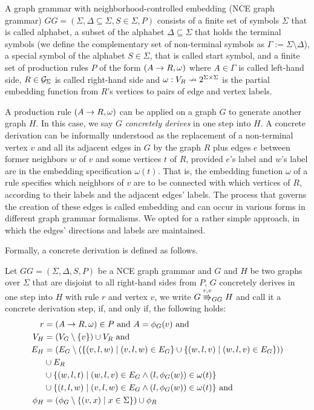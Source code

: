 \documentclass[runningheads]{llncs}
\begin{document}
\begin{definition}
	\label{def:gg}
	A graph grammar with neighborhood-controlled embedding (NCE graph grammar) $\mathit{GG} = (\Sigma, \Delta \subseteq \Sigma, S \in \Sigma, P)$ consists of a finite set of symbols $\Sigma$ that is called alphabet, a subset of the alphabet $\Delta \subseteq \Sigma$ that holds the terminal symbols (we define the complementary set of non-terminal symbols as $\Gamma := \Sigma \setminus \Delta$), a special symbol of the alphabet $S \in \Sigma$, that is called start symbol, and a finite set of production rules $P$ of the form $(A \to R, \omega)$ where $A \in \Gamma$ is called left-hand side, $R \in \mathcal{G}_{\Sigma}$ is called right-hand side and $\omega : V_R \nrightarrow 2^{\Sigma \times \Sigma}$ is the partial embedding function from $R$'s vertices to pairs of edge and vertex labels.
\end{definition}

A production rule $(A \to R, \omega)$ can be applied on a graph $G$ to generate another graph $H$. In this case, we say $G$ \textit{concretely derives} in one step into $H$. A concrete derivation can be informally understood as the replacement of a non-terminal vertex $v$ and all its adjacent edges in $G$ by the graph $R$ plus edges $e$ between former neighbors $w$ of $v$ and some vertices $t$ of $R$, provided $e$'s label and $w$'s label are in the embedding specification $\omega(t)$. That is, the embedding function $\omega$ of a rule specifies which neighbors of $v$ are to be connected with which vertices of $R$, according to their labels and the adjacent edges' labels. The process that governs the creation of these edges is called embedding and can occur in various forms in different graph grammar formalisms. We opted for a rather simple approach, in which the edges' directions and labels are maintained.

Formally, a concrete derivation is defined as follows.

\begin{definition}
	\label{def:gg_dstep}
	Let $\mathit{GG} = (\Sigma, \Delta, S, P)$ be a NCE graph grammar and $G$ and $H$ be two graphs over $\Sigma$ that are disjoint to all right-hand sides from $P$, $G$ concretely derives in one step into $H$ with rule $r$ and vertex $v$, we write $G \cderiv{r}{v}{GG} H$ and call it a concrete derivation step, if, and only if, the following holds:
	\begin{align*}
	r & = (A \to R, \omega) \in P \text{ and } A = \phi_G(v) \text{ and} \\
	V_H  & = (V_G \setminus \{v\}) \cup V_R \text{ and} \\
	E_H & = (E_G \setminus (\{(v,l,w) \; | \; (v,l,w) \in E_G\} \cup \{(w,l,v) \; | \; (w,l,v) \in E_G\})) \\
	& \cup E_R \\
	& \cup \{(w,l,t) \; | \; (w,l,v) \in E_G \land (l,\phi_G(w)) \in \omega(t)\} \\
	& \cup \{(t,l,w) \; | \; (v,l,w) \in E_G \land (l,\phi_G(w)) \in \omega(t)\} \text{ and} \\
	\phi_H & = (\phi_G \setminus \{(v,x) \; | \; x \in \Sigma \}) \cup \phi_R
	\end{align*}
\end{definition}
\end{document}
